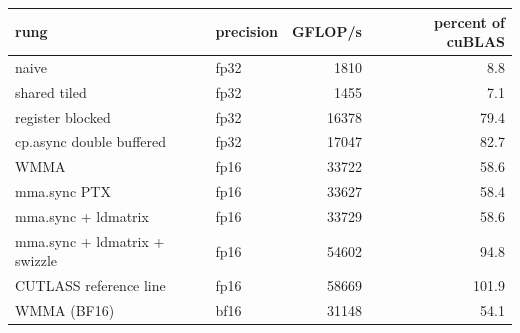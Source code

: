 \begin{tabular}{llrr}
\toprule
rung & precision & GFLOP/s & percent of cuBLAS \\
\midrule
naive & fp32 & 1810 & 8.8 \\
shared tiled & fp32 & 1455 & 7.1 \\
register blocked & fp32 & 16378 & 79.4 \\
cp.async double buffered & fp32 & 17047 & 82.7 \\
WMMA & fp16 & 33722 & 58.6 \\
mma.sync PTX & fp16 & 33627 & 58.4 \\
mma.sync + ldmatrix & fp16 & 33729 & 58.6 \\
mma.sync + ldmatrix + swizzle & fp16 & 54602 & 94.8 \\
CUTLASS reference line & fp16 & 58669 & 101.9 \\
WMMA (BF16) & bf16 & 31148 & 54.1 \\
\bottomrule
\end{tabular}
